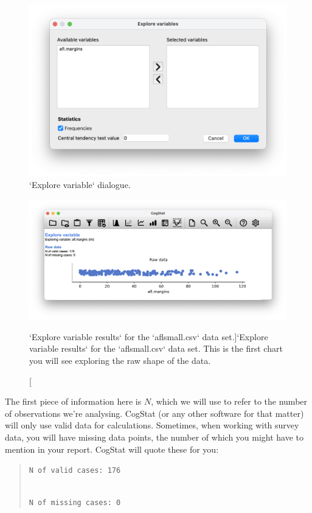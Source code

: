 \documentclass[
  11pt,
]{book}
\theoremstyle{definition}
\theoremstyle{definition}
\theoremstyle{definition}
\theoremstyle{definition}
\theoremstyle{remark}
\begin{document}
\begin{figure}

{\centering \includegraphics[width=0.66\linewidth]{resources/image/explorevariable} 

}

\caption{`Explore variable` dialogue.}\label{fig:explorevariabledialog}
\end{figure}

\begin{figure}

{\centering \includegraphics[width=0.66\linewidth]{resources/image/cogstatrawaflsmall} 

}

\caption[`Explore variable results` for the `aflsmall.csv` data set.]{`Explore variable results` for the `aflsmall.csv` data set. This is the first chart you will see exploring the raw shape of the data.}\label{fig:rawaflsmall}
\end{figure}

The first piece of information here is \(N\), which we will use to refer to the number of observations we're analysing. CogStat (or any other software for that matter) will only use valid data for calculations. Sometimes, when working with survey data, you will have missing data points, the number of which you might have to mention in your report. CogStat will quote these for you:

\begin{quote}
\texttt{N\ of\ valid\ cases:\ 176}\strut \\
\texttt{N\ of\ missing\ cases:\ 0}
\end{quote}
\end{document}
